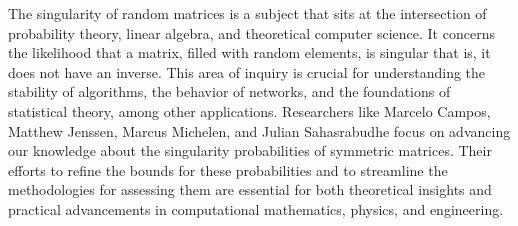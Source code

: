 The singularity of random matrices is a subject that sits at the intersection of probability theory, linear algebra, and theoretical computer science. It concerns the likelihood that a matrix, filled with random elements, is singular that is, it does not have an inverse. 
This area of inquiry is crucial for understanding the stability of algorithms, the behavior of networks, and the foundations of statistical theory, among other applications. 
Researchers like Marcelo Campos, Matthew Jenssen, Marcus Michelen, and Julian Sahasrabudhe focus on advancing our knowledge about the singularity probabilities of symmetric matrices. 
Their efforts to refine the bounds for these probabilities and to streamline the methodologies for assessing them are essential for both theoretical insights and practical advancements in computational mathematics, physics, and engineering.